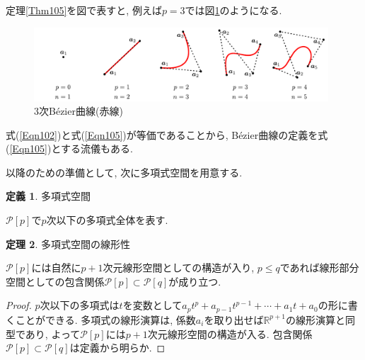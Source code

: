 \documentclass{jsarticle}
\newcommand\setR{\mathbb{R}}
\theoremstyle{definition}%
\newtheorem{thm}{定理}
\newtheorem{defn}[thm]{定義}
\begin{document}
定理\ref{Thm105}を図で表すと, 例えば$p=3$では図\ref{Fig103}のようになる.
\addtocounter{footnote}{-1}
\begin{figure}[htbp]
	\centering
    \includegraphics[page=3,clip,width=110mm]{fig.pdf}
	\caption{3次B\'ezier曲線(赤線)\protect\footnotemark}
	\label{Fig103}
\end{figure}

\noindent
式(\ref{Eqn102})と式(\ref{Eqn105})が等価であることから, B\'ezier曲線の定義を式(\ref{Eqn105})とする流儀もある.

以降のための準備として, 次に多項式空間を用意する.
\begin{screen}
	\begin{defn}
		多項式空間

		$\mathcal{P}[p]$で$p$次以下の多項式全体を表す.
	\end{defn}
\end{screen}
\begin{screen}
	\begin{thm}
		\label{Thm103}
		多項式空間の線形性

		$\mathcal{P}[p]$には自然に$p+1$次元線形空間としての構造が入り, $p\le q$であれば線形部分空間としての包含関係$\mathcal{P}[p]\subset\mathcal{P}[q]$が成り立つ.
	\end{thm}
\end{screen}
\begin{proof}
    $p$次以下の多項式は$t$を変数として$a_p t^p+a_{p-1} t^{p-1}+\cdots+a_1 t+a_0$の形に書くことができる.
    多項式の線形演算は, 係数$a_i$を取り出せば$\setR^{p+1}$の線形演算と同型であり, よって$\mathcal{P}[p]$には$p+1$次元線形空間の構造が入る.
    包含関係$\mathcal{P}[p]\subset\mathcal{P}[q]$は定義から明らか.
\end{proof}
\end{document}
